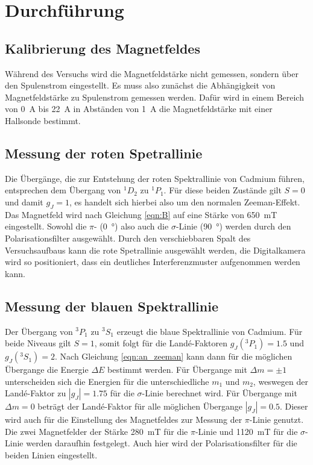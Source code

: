 \section{Durchführung}
\subsection{Kalibrierung des Magnetfeldes}
Während des Versuchs wird die Magnetfeldstärke nicht gemessen, sondern über den Spulenstrom eingestellt.
Es muss also zunächst die Abhängigkeit von Magnetfeldstärke zu Spulenstrom gemessen werden.
Dafür wird in einem Bereich von \SI{0}{\ampere} bis \SI{22}{\ampere} in Abständen von \SI{1}{\ampere} die Magnetfeldstärke mit einer Hallsonde bestimmt.

\subsection{Messung der roten Spetrallinie}

Die Übergänge, die zur Entstehung der roten Spektrallinie von Cadmium führen, entsprechen dem Übergang von $^1D_2$ zu $^1P_1$.
Für diese beiden Zustände gilt $S=0$ und damit $g_J = 1$, es handelt sich hierbei also um den normalen Zeeman-Effekt.
Das Magnetfeld wird nach Gleichung \eqref{eqn:B} auf eine Stärke von \SI{650}{\milli\tesla} eingestellt.
Sowohl die $\pi$- (\SI{0}{\degree}) also auch die $\sigma$-Linie (\SI{90}{\degree}) werden durch den Polarisationsfilter ausgewählt.
Durch den verschiebbaren Spalt des Versuchsaufbaus kann die rote Spetrallinie ausgewählt werden, die Digitalkamera wird so positioniert, dass ein deutliches Interferenzmuster aufgenommen werden kann.


\subsection{Messung der blauen Spektrallinie}
Der Übergang von $^3P_1$ zu $^3S_1$ erzeugt die blaue Spektrallinie von Cadmium.
Für beide Niveaus gilt $S=1$, somit folgt für die Landé-Faktoren $g_J(^3P_1) = \num{1.5}$ und $g_J(^3S_1) = \num{2}$.
Nach Gleichung \ref{eqn:an_zeeman} kann dann für die möglichen Übergange die Energie $\Delta E$ bestimmt werden.
Für Übergange mit $\Delta m = \pm 1$ unterscheiden sich die Energien für die unterschiedliche $m_1$ und $m_2$, weswegen der Landé-Faktor zu $|g_J| = \num{1.75}$
für die $\sigma$-Linie berechnet wird.
Für Übergange mit $\Delta m = 0$ beträgt der Landé-Faktor für alle möglichen Übergange $|g_J| = \num{0.5}$.
Dieser wird auch für die Einstellung des Magnetfeldes zur Messung der $\pi$-Linie genutzt.
Die zwei Magnetfelder der Stärke \SI{280}{\milli\tesla} für die $\pi$-Linie und \SI{1120}{\milli\tesla} für die $\sigma$-Linie werden daraufhin festgelegt.
Auch hier wird der Polarisationsfilter für die beiden Linien eingestellt.
